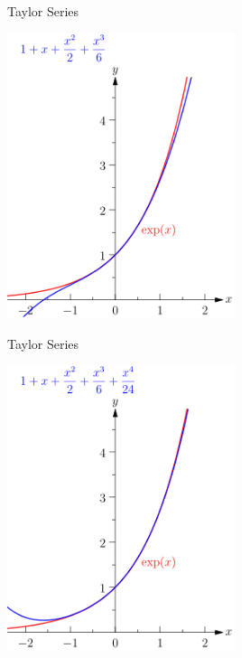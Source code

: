\documentclass{beamer}
\begin{document}
\begin{frame}{Taylor Series}
      \begin{center}

    \includegraphics[width=0.5\textwidth, height=\textheight, keepaspectratio]{Mfnf-exp-series-imageonline.co-60931-5.png}
  \end{center}
    
\end{frame}
\begin{frame}{Taylor Series}
      \begin{center}

    \includegraphics[width=0.5\textwidth, height=\textheight, keepaspectratio]{Mfnf-exp-series-imageonline.co-60931-6.png}
  \end{center}
    
\end{frame}
\end{document}
